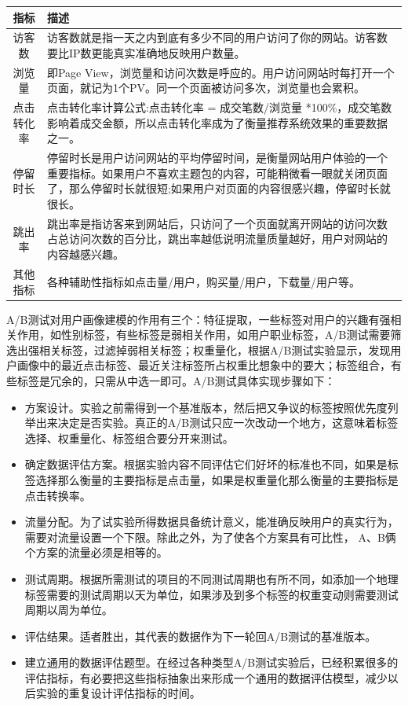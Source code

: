       \begin{table}[htp]
      \centering
      \label{tab:abtest}
      \begin{tabular}{ |c|p{10cm}| } \hline
       指标 & 描述 \\ \hline
       访客数 & 访客数就是指一天之内到底有多少不同的用户访问了你的网站。访客数要比IP数更能真实准确地反映用户数量。\\ \hline
       浏览量 & 即Page View，浏览量和访问次数是呼应的。用户访问网站时每打开一个页面，就记为1个PV。同一个页面被访问多次，浏览量也会累积。 \\ \hline
       点击转化率 & 点击转化率计算公式:点击转化率 = 成交笔数/浏览量 *100\%，成交笔数影响着成交金额，所以点击转化率成为了衡量推荐系统效果的重要数据之一。\\ \hline
       停留时长 & 停留时长是用户访问网站的平均停留时间，是衡量网站用户体验的一个重要指标。如果用户不喜欢主题包的内容，可能稍微看一眼就关闭页面了，那么停留时长就很短;如果用户对页面的内容很感兴趣，停留时长就很长。\\ \hline
       跳出率 & 跳出率是指访客来到网站后，只访问了一个页面就离开网站的访问次数占总访问次数的百分比，跳出率越低说明流量质量越好，用户对网站的内容越感兴趣。 \\ \hline
       其他指标 & 各种辅助性指标如点击量/用户，购买量/用户，下载量/用户等。\\ \hline
      \end{tabular}
      \end{table}

      A/B测试对用户画像建模的作用有三个：特征提取，一些标签对用户的兴趣有强相关作用，如性别标签，有些标签是弱相关作用，如用户职业标签，A/B测试需要筛选出强相关标签，过滤掉弱相关标签；权重量化，根据A/B测试实验显示，发现用户画像中的最近点击标签、最近关注标签所占权重比想象中的要大；标签组合，有些标签是冗余的，只需从中选一即可。A/B测试具体实现步骤如下：

      \begin{itemize}
      \item 方案设计。实验之前需得到一个基准版本，然后把又争议的标签按照优先度列举出来决定是否实验。真正的A/B测试只应一次改动一个地方，这意味着标签选择、权重量化、标签组合要分开来测试。
      \item 确定数据评估方案。根据实验内容不同评估它们好坏的标准也不同，如果是标签选择那么衡量的主要指标是点击量，如果是权重量化那么衡量的主要指标是点击转换率。
      \item 流量分配。为了试实验所得数据具备统计意义，能准确反映用户的真实行为，需要对流量设置一个下限。除此之外，为了使各个方案具有可比性， A、B俩个方案的流量必须是相等的。
      \item 测试周期。根据所需测试的项目的不同测试周期也有所不同，如添加一个地理标签需要的测试周期以天为单位，如果涉及到多个标签的权重变动则需要测试周期以周为单位。
      \item 评估结果。适者胜出，其代表的数据作为下一轮回A/B测试的基准版本。
      \item 建立通用的数据评估题型。在经过各种类型A/B测试实验后，已经积累很多的评估指标，有必要把这些指标抽象出来形成一个通用的数据评估模型，减少以后实验的重复设计评估指标的时间。
      \end{itemize}

